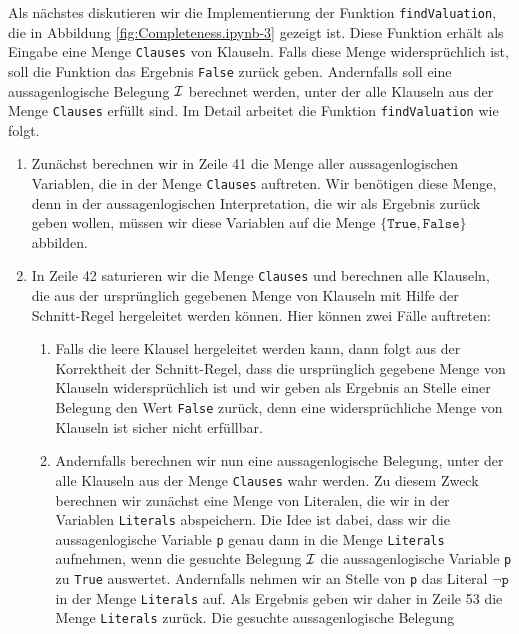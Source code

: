 \FloatBarrier

Als nächstes diskutieren wir die Implementierung der Funktion \texttt{findValuation}, die in
Abbildung \ref{fig:Completeness.ipynb-3} gezeigt ist.  Diese Funktion erhält als Eingabe eine Menge
\texttt{Clauses} von Klauseln.  Falls diese Menge widersprüchlich ist, soll die Funktion
das Ergebnis \texttt{False} zurück geben.  Andernfalls soll eine aussagenlogische Belegung $\mathcal{I}$ berechnet werden,
unter der alle Klauseln aus der Menge \texttt{Clauses} erfüllt sind.
Im Detail arbeitet die Funktion \texttt{findValuation} wie folgt.
\begin{enumerate}
\item Zunächst berechnen wir in Zeile 41 die Menge aller aussagenlogischen Variablen, die in der Menge
      \texttt{Clauses} auftreten.  Wir benötigen diese Menge, denn in der
      aussagenlogischen Interpretation, die wir als Ergebnis zurück geben wollen, müssen 
      wir diese Variablen auf die Menge $\{ \texttt{True}, \texttt{False} \}$ abbilden.       
\item In Zeile 42 saturieren wir die Menge \texttt{Clauses} und berechnen alle Klauseln, die aus der
      ursprünglich gegebenen Menge von Klauseln mit Hilfe der Schnitt-Regel hergeleitet werden
      können.  Hier können zwei Fälle auftreten:
      \begin{enumerate}
      \item Falls die leere Klausel hergeleitet werden kann, dann folgt aus der Korrektheit der Schnitt-Regel,
            dass die ursprünglich gegebene Menge von Klauseln widersprüchlich ist und wir geben als Ergebnis an
            Stelle einer Belegung den Wert \texttt{False} zurück, denn eine widersprüchliche Menge von Klauseln
            ist sicher nicht erfüllbar.
      \item Andernfalls berechnen wir nun eine aussagenlogische Belegung, unter der alle Klauseln aus
            der Menge \texttt{Clauses} wahr werden.  Zu diesem Zweck berechnen wir zunächst eine Menge von
            Literalen, die wir in der Variablen \texttt{Literals} abspeichern.  Die Idee ist dabei, dass wir
            die aussagenlogische Variable \texttt{p} genau dann in die Menge \texttt{Literals} aufnehmen, wenn
            die gesuchte Belegung $\mathcal{I}$ die aussagenlogische
            Variable \texttt{p} zu \texttt{True} auswertet.  Andernfalls nehmen wir an Stelle von \texttt{p} das
            Literal $\neg \texttt{p}$ in der Menge \texttt{Literals} auf.  Als Ergebnis geben wir daher in
            Zeile 53 die Menge \texttt{Literals} zurück.  Die gesuchte aussagenlogische Belegung

\end{enumerate}
\end{enumerate}
